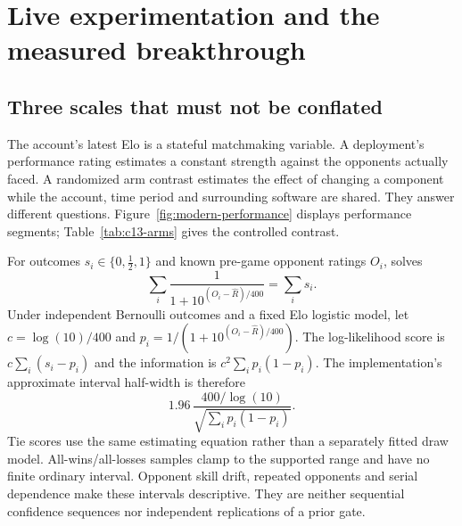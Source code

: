 \section{Live experimentation and the measured breakthrough}
\label{sec:live-method}

\subsection{Three scales that must not be conflated}
The account's latest Elo is a stateful matchmaking variable. A deployment's
performance rating estimates a constant strength against the opponents
actually faced. A randomized arm contrast estimates the effect of changing a
component while the account, time period and surrounding software are shared.
They answer different questions. Figure~\ref{fig:modern-performance} displays
performance segments; Table~\ref{tab:c13-arms} gives the controlled contrast.

For outcomes $s_i\in\{0,\tfrac12,1\}$ and known pre-game opponent ratings
$O_i$,  solves
\begin{equation}
  \sum_i \frac{1}{1+10^{(O_i-\widehat R)/400}}=\sum_i s_i.
  \label{eq:performance-rating}
\end{equation}
Under independent Bernoulli outcomes and a fixed Elo logistic model, let
$c=\log(10)/400$ and $p_i=1/(1+10^{(O_i-\widehat R)/400})$. The log-likelihood
score is $c\sum_i(s_i-p_i)$ and the information is
$c^2\sum_ip_i(1-p_i)$. The implementation's approximate interval half-width
is therefore
\begin{equation}
  1.96\,\frac{400/\log(10)}{\sqrt{\sum_i p_i(1-p_i)}}.
  \label{eq:performance-interval}
\end{equation}
Tie scores use the same estimating equation rather than a separately fitted
draw model. All-wins/all-losses samples clamp to the supported range and have
no finite ordinary interval. Opponent skill drift, repeated opponents and
serial dependence make these intervals descriptive. They are neither
sequential confidence sequences nor independent replications of a prior gate.

